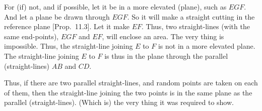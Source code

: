 \begin{Parallel}{}{}
{For (if)  not, and if possible, let it be in a more elevated (plane), such as
$EGF$. And let a plane be drawn through $EGF$. So it will
make a straight cutting in the reference plane [Prop.~11.3]. Let it make $EF$. Thus, two straight-lines (with the
same end-points), $EGF$ and $EF$,  will enclose an area. The very thing is
impossible. Thus, the straight-line joining $E$ to $F$ is not in a more
elevated plane. The straight-line joining $E$ to $F$ is thus in the plane
through the parallel (straight-lines) $AB$ and $CD$.

Thus, if there are two parallel straight-lines, and
random points are taken on each of them, then the straight-line joining the
two points is in the same plane as the parallel (straight-lines). (Which is)
the very thing it was required to show.}
\end{Parallel}

